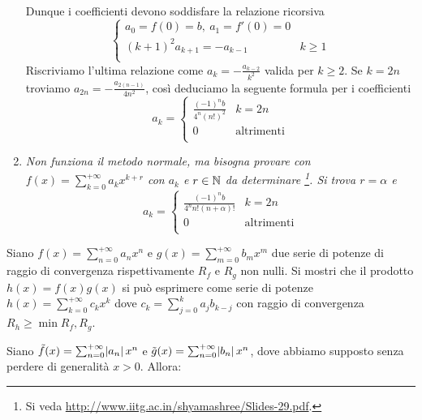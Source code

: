 \documentclass[a4paper]{article}\par \usepackage{style}\par
\begin{document}
\begin{enumerate}[label = (\roman*)]
\begin{gather*}
  \end{gather*}
  Dunque i coefficienti devono soddisfare la relazione ricorsiva
  \begin{equation*}
    \begin{cases}
      a_0 = f(0) = b, \ a_1 = f'(0) = 0 \\
      (k + 1)^2 a_{k + 1} = - a_{k - 1} & k \geq 1 \\
    \end{cases}
  \end{equation*}
  Riscriviamo l'ultima relazione come $ a_k = - \frac{a_{k - 2}}{k^2} $ valida per $ k \geq 2 $. Se $ k = 2n $ troviamo $ a_{2n} = - \frac{a_{2(n - 1)}}{4 n^2} $, così deduciamo la seguente formula per i coefficienti
  \begin{equation*}
    a_k =
    \begin{cases}
      \frac{(-1)^n b}{4^{n} (n!)^2} & k = 2n \\
      0 & \text{altrimenti} \\
    \end{cases}
  \end{equation*}
\item \emph{Non funziona il metodo normale, ma bisogna provare con $ f(x) = \sum_{k = 0}^{+\infty} a_k x^{k + r} $ con $ a_k $ e $ r \in \mathbb{N} $ da determinare \footnote{Si veda \url{http://www.iitg.ac.in/shyamashree/Slides-29.pdf}.}. Si trova $ r = \alpha $ e }
  \begin{equation*}
    a_k =
    \begin{cases}
      \frac{(-1)^n b}{4^n n! (n + \alpha)!} & k = 2n \\
      0 & \text{altrimenti} \\
    \end{cases}
  \end{equation*}
\end{enumerate}\par \begin{es} \label{es:prodotto_cauchy}
  Siano $ f(x) = \sum_{n = 0}^{+\infty} a_n x^n $ e $ g(x) = \sum_{m = 0}^{+\infty} b_m x^m $ due serie di potenze di raggio di convergenza rispettivamente $ R_f $ e $ R_g $  non nulli. Si mostri che il prodotto $ h(x) = f(x) g(x) $ si può esprimere come serie di potenze $ h(x) = \sum_{k = 0}^{+\infty} c_k x^k $ dove $ c_k = \sum_{j = 0}^{k} a_j b_{k - j} $ con raggio di convergenza $ R_h \geq \min{R_f, R_g} $.
\end{es}
Siano $ \tilde f(x) = \sum_{n=0}^{+\infty} \abs{a_n} x^n $ e $ \tilde g(x) = \sum_{n=0}^{+\infty} \abs{b_n} x^n $, dove abbiamo supposto senza perdere di generalità $ x>0 $. Allora:
\end{document}
